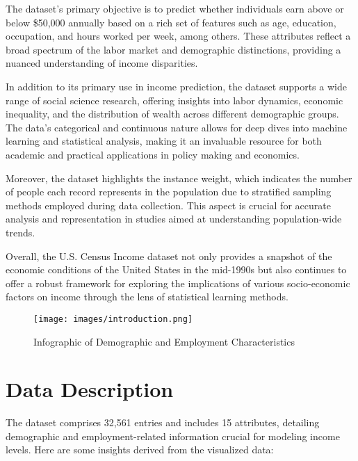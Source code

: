 \documentclass[12pt]{article}
\begin{document}
The dataset’s primary objective is to predict whether individuals earn above or below \$50,000 annually based on a rich set of features such as age, education, occupation, and hours worked per week, among others. These attributes reflect a broad spectrum of the labor market and demographic distinctions, providing a nuanced understanding of income disparities.

In addition to its primary use in income prediction, the dataset supports a wide range of social science research, offering insights into labor dynamics, economic inequality, and the distribution of wealth across different demographic groups. The data's categorical and continuous nature allows for deep dives into machine learning and statistical analysis, making it an invaluable resource for both academic and practical applications in policy making and economics.

Moreover, the dataset highlights the instance weight, which indicates the number of people each record represents in the population due to stratified sampling methods employed during data collection. This aspect is crucial for accurate analysis and representation in studies aimed at understanding population-wide trends.

Overall, the U.S. Census Income dataset not only provides a snapshot of the economic conditions of the United States in the mid-1990s but also continues to offer a robust framework for exploring the implications of various socio-economic factors on income through the lens of statistical learning methods.

\begin{figure}[H]
    \centering
    \texttt{[image: images/introduction.png]}
    \caption{Infographic of Demographic and Employment Characteristics}
\end{figure}
 


\section{Data Description}
The dataset comprises 32,561 entries and includes 15 attributes, detailing demographic and employment-related information crucial for modeling income levels. Here are some insights derived from the visualized data:
\end{document}
